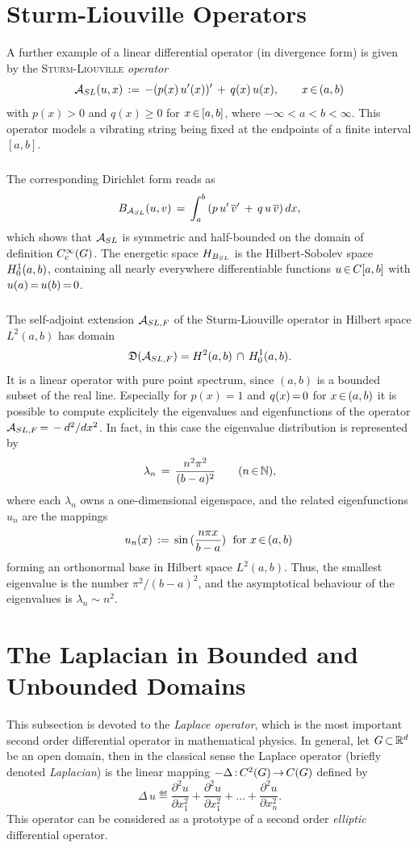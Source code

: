 \documentclass[11pt,twoside]{article}
\begin{document}
\section{Sturm-Liouville Operators}
A further example of a linear differential operator (in divergence form)
is given by the \textsc{Sturm-Liouville} \textit{operator}
\[
{\mathcal{A}}_{SL}(u,x) \,:=\, -(p(x)\, u'(x))' \, + \, q(x)\, u(x),
\quad \quad x {\,\in\,} (a,b)
\]
with $p(x) > 0$ and $q(x) \geq 0$ for $x {\,\in\,} [a,b]$,
where $-\infty < a < b < \infty$.
This operator models a vibrating string
being fixed at the endpoints of a finite interval $[a,b]$.

\subparagraph*{}
The corresponding Dirichlet form reads as
\[
B_{{\mathcal{A}}_{SL}}(u,v) \,=\,
\int_a^b \,
(p \, u'\, \overline{v}' \, + \, q \, u \, \overline{v}) \, dx,
\]
which shows that ${\mathcal{A}}_{SL}$ is symmetric and half-bounded
on the domain of definition $C_c^{\infty}(G)$.
The energetic space $H_{B_{SL}}$ is the Hilbert-Sobolev space $H_0^{1}(a,b)$,
containing all nearly everywhere differentiable functions
$u {\,\in\,} C[a,b]$ with $u(a) {\,=\,} u(b) {\,=\,} 0$.

\subparagraph*{}
The self-adjoint extension ${\mathcal{A}}_{SL,F}$ of the Sturm-Liouville operator
in Hilbert space $L^2(a,b)$ has domain
\[
\mathfrak{D}({\mathcal{A}}_{SL,F}) = H^2(a,b) \, \cap \, H_0^{1}(a,b).
\]
It is a linear operator with pure point spectrum,
since $(a,b)$ is a bounded subset of the real line.
Especially for $p(x)=1$ and $q(x) {\,=\,} 0$ for $x {\,\in\,} (a,b)$ it is possible
to compute explicitely the eigenvalues and eigenfunctions
of the operator ${\mathcal{A}}_{SL,F} {\,=\,} - {d^2} / {dx^2}$.
In fact,
in this case the eigenvalue distribution is represented by
\[
\lambda_n \,=\, \frac{n^2 \pi^2}{(b-a)^2} \quad \quad (n {\,\in\,} {\mathbb{N}}),
\]
where each $\lambda_n$ owns a one-dimensional eigenspace,
and the related eigenfunctions $u_n$ are the mappings
\[
u_n(x) \,:=\, \sin \, (\frac{n \pi x}{b-a}) \; \mbox{ for } x {\,\in\,} (a,b)\,
\]
forming an orthonormal base in Hilbert space $L^2(a,b)$.
Thus,
the smallest eigenvalue is the number $\pi^2/(b-a)^2$,
and the asymptotical behaviour of the eigenvalues
is $\lambda_n \sim n^2$.

\section{The Laplacian in Bounded and Unbounded Domains}
This subsection is devoted to the \textit{Laplace operator},
which is the most important second order differential operator
in mathematical physics.
In general,
let $G {\,\subset\,} {\mathbb{R}}^d$ be an open domain, 
then in the classical sense the Laplace operator
(briefly denoted \emph{Laplacian})
is the linear mapping $-\Delta {\,:\,} C^2(G) {\,\to\,} C(G)$ defined by
\[
\Delta \, u \eqdef \frac{\partial^2 u}{\partial x_1^2} +
                     \frac{\partial^2 u}{\partial x_1^2} +
                     \ldots                              +
                     \frac{\partial^2 u}{\partial x_n^2}.
\]
This operator can be considered as a prototype
of a second order \textit{elliptic} differential operator.
\end{document}
